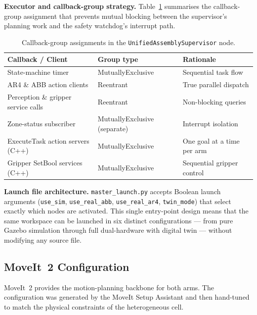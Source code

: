 \textbf{Executor and callback-group strategy.} Table~\ref{tab:ch6_cbgroups} summarises the callback-group assignment that prevents
mutual blocking between the supervisor's planning work and the safety watchdog's interrupt path.

\begin{table}[H]
\centering
\caption{Callback-group assignments in the \texttt{UnifiedAssemblySupervisor} node.}
\label{tab:ch6_cbgroups}
\setlength{\tabcolsep}{6pt}
\begin{tabular}{lll}
\toprule
\textbf{Callback / Client}          & \textbf{Group type}           & \textbf{Rationale} \\
\midrule
State-machine timer                 & MutuallyExclusive             & Sequential task flow \\
AR4 \& ABB action clients           & Reentrant                     & True parallel dispatch \\
Perception \& gripper service calls & Reentrant                     & Non-blocking queries \\
Zone-status subscriber              & MutuallyExclusive (separate)  & Interrupt isolation \\
ExecuteTask action servers (C++)    & MutuallyExclusive             & One goal at a time per arm \\
Gripper SetBool services (C++)      & MutuallyExclusive             & Sequential gripper control \\
\bottomrule
\end{tabular}
\end{table}

\textbf{Launch file architecture.} \texttt{master\_launch.py} accepts Boolean launch arguments
(\texttt{use\_sim}, \texttt{use\_real\_abb}, \texttt{use\_real\_ar4}, \texttt{twin\_mode})
that select exactly which nodes are activated.  This single entry-point design means that the
same workspace can be launched in six distinct configurations — from pure Gazebo simulation
through full dual-hardware with digital twin — without modifying any source file.

\subsection{MoveIt~2 Configuration}
\label{subsec:ch6_moveit}

MoveIt~2 provides the motion-planning backbone for both arms.  The configuration was generated
by the MoveIt Setup Assistant and then hand-tuned to match the physical constraints of the
heterogeneous cell.

